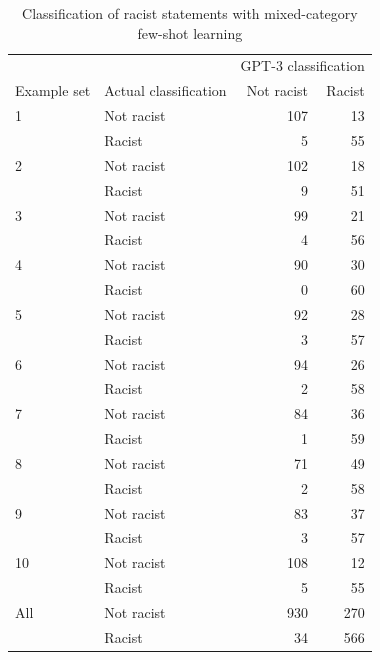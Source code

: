 \documentclass[12pt,]{article}
\begin{document}
\begin{table}[!h]

\caption{\label{tab:fewshotmixed-racism}Classification of racist statements with mixed-category few-shot learning}
\centering
\fontsize{8}{10}\selectfont
\begin{tabular}[t]{llrr}
\toprule
\multicolumn{2}{c}{ } & \multicolumn{2}{c}{GPT-3 classification} \\
\cmidrule(l{3pt}r{3pt}){3-4}
Example set & Actual classification & Not racist & Racist\\
\midrule
1 & Not racist & 107 & 13\\
 & Racist & 5 & \vphantom{1} 55\\
\midrule
2 & Not racist & 102 & 18\\
 & Racist & 9 & 51\\
\midrule
3 & Not racist & 99 & 21\\
 & Racist & 4 & 56\\
\midrule
4 & Not racist & 90 & 30\\
 & Racist & 0 & 60\\
\midrule
5 & Not racist & 92 & 28\\
 & Racist & 3 & \vphantom{1} 57\\
\midrule
6 & Not racist & 94 & 26\\
 & Racist & 2 & \vphantom{1} 58\\
\midrule
7 & Not racist & 84 & 36\\
 & Racist & 1 & 59\\
\midrule
8 & Not racist & 71 & 49\\
 & Racist & 2 & 58\\
\midrule
9 & Not racist & 83 & 37\\
 & Racist & 3 & 57\\
\midrule
10 & Not racist & 108 & 12\\
 & Racist & 5 & 55\\
\midrule
All & Not racist & 930 & 270\\
 & Racist & 34 & 566\\
\bottomrule
\end{tabular}
\end{table}
\end{document}
